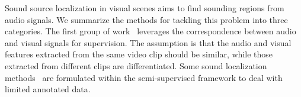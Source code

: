 %
%

Sound source localization in visual scenes aims to find sounding regions from audio signals. 
%
We summarize the methods for tackling this problem into three categories.
%
The first group of work~\cite{av_cvpr18_lls,av_tpami20_lls,av_eccv20_objs_vids} leverages the correspondence between audio and visual signals for supervision.
%
The assumption is that the audio and visual features extracted from the same video clip should be similar, while those extracted from different clips are differentiated.
%
%
%
Some sound localization methods~\cite{av_cvpr18_lls,av_tpami20_lls} are formulated within the semi-supervised framework to deal with limited annotated data.
%
